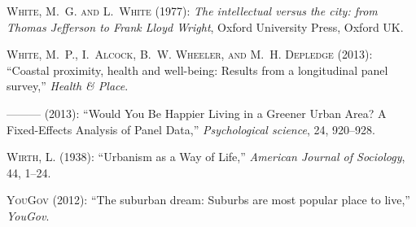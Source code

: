 \documentclass[10pt, letterpaper]{article}
\begin{document}
\begin{spacing}{2.0}
\begin{thebibliography}{115}
\textsc{White, M.~G. and L.~White} (1977): \emph{The intellectual versus the
  city: from Thomas Jefferson to Frank Lloyd Wright}, Oxford University Press,
  Oxford UK.

\textsc{White, M.~P., I.~Alcock, B.~W. Wheeler, and M.~H. Depledge}
  (2013{}): \enquote{Coastal proximity, health and well-being:
  Results from a longitudinal panel survey,} \emph{Health \& Place}.

---\hspace{-.1pt}---\hspace{-.1pt}--- (2013{}): \enquote{Would You
  Be Happier Living in a Greener Urban Area? A Fixed-Effects Analysis of Panel
  Data,} \emph{Psychological science}, 24, 920--928.

\textsc{Wirth, L.} (1938): \enquote{Urbanism as a Way of Life,} \emph{American
  Journal of Sociology}, 44, 1--24.

\textsc{YouGov} (2012): \enquote{The suburban dream: Suburbs are most popular
  place to live,} \emph{YouGov}.

\end{thebibliography}


\end{spacing}
\end{document}
